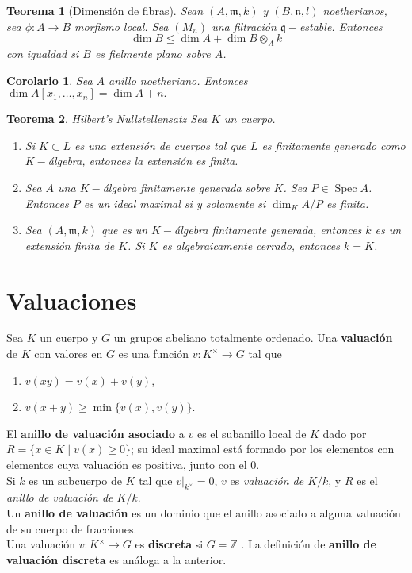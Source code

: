 \documentclass[12pt]{book}
\newtheorem{teo}{Teorema}
\newtheorem{cor}{Corolario}
\begin{document}
\begin{teo}[Dimensión de fibras]
	Sean $(A, \mathfrak{m}, k)$ y $(B, \mathfrak{n}, l)$ noetherianos, sea $\phi:A \rightarrow B$ morfismo local. Sea $(M_n)$ una filtración $\mathfrak{q}-$estable. Entonces $$ \dim B \leq \dim A + \dim B \otimes_A k $$
	con igualdad si $B$ es fielmente plano sobre $A$.
\end{teo}

\begin{cor}
	Sea $A$ anillo noetheriano. Entonces $\dim A[x_1, \ldots, x_n]= \dim A +n.$
\end{cor}


\begin{teo}{Hilbert's Nullstellensatz}
	Sea $K$ un cuerpo. 
	\begin{enumerate}
		\item Si $K\subset L $ es una extensión de cuerpos tal que $L$ es finitamente generado como $K-$álgebra, entonces la extensión es finita.
		\item Sea $A$ una $K-$álgebra finitamente generada sobre $K$. Sea $P\in \operatorname{Spec} A$. Entonces $P$ es un ideal maximal si y solamente si $\dim_K A/P$ es finita. 
		\item Sea $(A, \mathfrak{m}, k)$ que es un $K-$álgebra finitamente generada, entonces $k$ es un extensión finita de $K$. Si $K$ es algebraicamente cerrado, entonces $k =K$.
	\end{enumerate}
\end{teo}







\section{Valuaciones}

Sea $K$ un cuerpo y $G$ un grupos abeliano totalmente ordenado. Una \textbf{valuación} de $K$ con valores en $G$ es una función $v: K^\times \rightarrow G$ tal que
\begin{enumerate}
	\item $v(xy)=v(x)+v(y)$,
	\item $v(x+y)\geq \min \{v(x), v(y)\}$.
\end{enumerate}

El \textbf{anillo de valuación asociado} a $v$ es el subanillo local de $K$ dado por $R = \{ x\in K \; | \; v(x) \geq 0 \}$; su ideal maximal está formado por los elementos con elementos cuya valuación es positiva, junto con el $0$.\\
Si $k$ es un subcuerpo de $K$ tal que $v|_{k^\times} =0$, $v$ es \textit{valuación de $K/k$}, y $R$ es el \textit{anillo de valuación de $K/k$}.\\ 
Un \textbf{anillo de valuación} es un dominio que el anillo asociado a alguna valuación de su cuerpo de fracciones.\\
Una valuación $v: K^\times \rightarrow G$ es \textbf{discreta} si $G= \mathbb{Z}$ . La definición de \textbf{anillo de valuación discreta} es análoga a la anterior.\\
\end{document}
